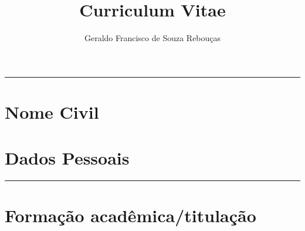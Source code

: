 \documentclass[10pt,
			   a4paper,
			   twoside,
			   extrafontsizes,
			   openright,
			   oldfontcommands]{memoir}
\title{Curriculum Vitae}
\author{Geraldo Francisco de Souza Rebouças} %
\date{\monthyeardate}
\def\maketitle{%
	\null
	\thispagestyle{empty}%
	\vfill
	\begin{center}
		\vspace{46mm} %
		{\fontsize{13}{16}\selectfont \textcolor{cinza}{\textbf{\theauthor}}\par}%
		{\thetitle\par}%
		\vspace{100mm} %
		{\thedate\par}%
	\end{center}%
	\null
	\cleardoublepage
}
\DeclareRobustCommand{\linha}{
	\noindent\hfil\rule[-1mm]{\textwidth}{0.2mm}\hfil
}
\begin{document}
	\maketitle

	\mainmatter
	{\fontsize{13}{16}\selectfont \textcolor{cinza}{\textbf{\theauthor}}}\par
	\thetitle\par
	\linha
	\section*{Nome Civil}
	\section*{Dados Pessoais}
	\linha
	\section*{Formação acadêmica/titulação}
	
\end{document}
